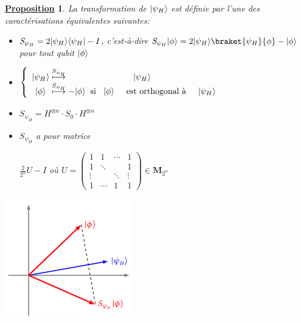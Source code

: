 \documentclass[12pt,openany]{report}
\newtheorem{proposition}{\underline{Proposition}}
\DeclarePairedDelimiter\bra{\langle}{\rvert}
\DeclarePairedDelimiter\ket{\lvert}{\rangle}
\begin{document}
\begin{proposition}
La transformation de $\ket{\psi_H} $ est  définie par l'une des caractérisations équivalentes suivantes:
\begin{itemize}
\item[(i)] $ \mathit{S}_{\psi_H}=2\ket{\psi_H}\bra{\psi_H}-I $, c'est-à-dire $ \mathit{S}_{\psi_H} \ket{\phi}=2\ket{\psi_H}\braket{\psi_H}{\phi}-\ket{\phi} $ pour tout qubit $\ket{\phi} $

\item[(ii)] $ 
  \left\lbrace 
\begin{array}{ c @{\hspace{0.1cm}\overset{S_{\psi_H}}{\longmapsto}\hspace{0.1cm}}  c }
\ket{\psi_H}& \ket{\psi_H}\\

\ket{\phi}& -\ket{\phi} \hspace{0.2cm} \text{si \hspace{0.2cm}} \ket{\phi} \hspace{0.5cm}\text{est orthogonal à} \hspace{0.5cm} \ket{\psi_H}
\end{array}
\right.
$
\item[(iii)] $ \mathit{S}_{\psi_H}=\mathit{H}^{\otimes n}\cdot \mathit{S}_0 \cdot \mathit{H}^{\otimes n} $

\item[(iv)] $\mathit{S}_{\psi_H} $ a pour matrice 
\begin{center}
$\frac{2}{2^n}\mathit{U}-I $ où $ \mathit{U}=\begin{pmatrix}
1 & 1      & \cdots & 1\\
1 & \ddots &        & 1\\
\vdots &    &    \ddots    & \vdots\\
1      &\cdots   &1&1
\end{pmatrix} \in \mathbf{M}_{2^n}  $
\end{center}



\end{itemize}

\begin{center}
\includegraphics[scale=1]{./transpo2}
\end{center}

\end{proposition}
\end{document}
